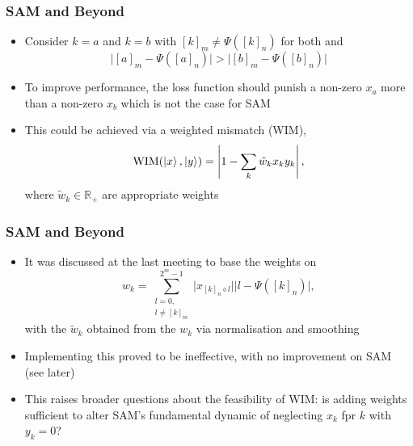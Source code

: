 \documentclass{beamer}
\begin{document}
\begin{frame}
\frametitle{SAM and Beyond}
\begin{itemize}
\item Consider $k=a$ and $k=b$ with $[k]_m \neq \Psi([k]_n)$ for both and 
\begin{equation}
\Big|[a]_m - \Psi([a]_n) \Big| > \Big|[b]_m - \Psi([b]_n) \Big| 
\end{equation}
\item To improve performance, the loss function should punish a non-zero $x_a$ more than a non-zero $x_b$ which is not the case for SAM
\item This could be achieved via a \alert{weighted mismatch (WIM)}, 
\begin{equation}
\text{WIM}(\ket{x}, \ket{y}) = \left\vert 1 - \sum_k \tilde{w}_k x_k y_k \right\vert, 
\end{equation}
where $\tilde{w}_k \in \mathbb{R}_+$ are appropriate weights
\end{itemize}
\end{frame}

\begin{frame}
\frametitle{SAM and Beyond}
\begin{itemize}
\item It was discussed at the last meeting to base the weights on
\begin{equation}
w_k = \sum^{2^m -1}_{\substack{l=0, \\ l \neq [k]_m}} \Big|x_{[k]_n \diamond l} \Big| \Big| l - \Psi([k]_n) \Big|,
\end{equation}
with the $\tilde{w}_k$ obtained from the $w_k$ via normalisation and smoothing
\item Implementing this \alert{proved to be ineffective}, with no improvement on SAM  (see later)
\item This raises broader questions about the \alert{feasibility of WIM}: is adding weights sufficient to alter SAM's fundamental dynamic of neglecting $x_k$ fpr $k$ with $y_k =0$?
\end{itemize}
\end{frame}
\end{document}
